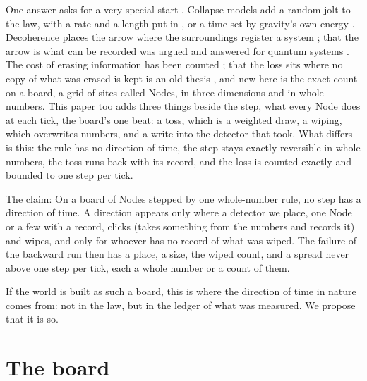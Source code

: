 \documentclass[pdflatex,sn-mathphys-num]{sn-jnl}
\begin{document}
One answer asks for a very special start \cite{boltzmann1877,boltzmann1896,rovelli2019}. Collapse models add a random jolt to the law, with a rate and a length put in \cite{grw1986}, or a time set by gravity's own energy \cite{penrose1996}. Decoherence places the arrow where the surroundings register a system \cite{zurek2003,joos1985}; that the arrow is what can be recorded was argued and answered for quantum systems \cite{maccone2009,jennings2010}. The cost of erasing information has been counted \cite{landauer1961,bennett1973,bennett1982,zurek1989}; that the loss sits where no copy of what was erased is kept is an old thesis \cite{bennett1982}, and new here is the exact count on a board, a grid of sites called Nodes, in three dimensions and in whole numbers. This paper too adds three things beside the step, what every Node does at each tick, the board's one beat: a toss, which is a weighted draw, a wiping, which overwrites numbers, and a write into the detector that took. What differs is this: the rule has no direction of time, the step stays exactly reversible in whole numbers, the toss runs back with its record, and the loss is counted exactly and bounded to one step per tick.

The claim: On a board of Nodes stepped by one whole-number rule, no step has a direction of time. A direction appears only where a detector we place, one Node or a few with a record, clicks (takes something from the numbers and records it) and wipes, and only for whoever has no record of what was wiped. The failure of the backward run then has a place, a size, the wiped count, and a spread never above one step per tick, each a whole number or a count of them.

If the world is built as such a board, this is where the direction of time in nature comes from: not in the law, but in the ledger of what was measured. We propose that it is so.

\section{The board}\label{sec:board}
\end{document}
